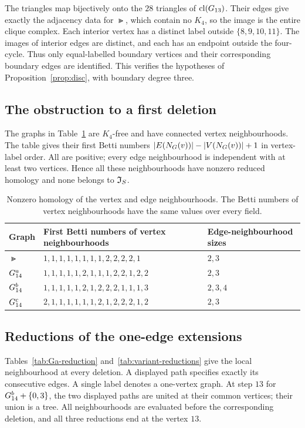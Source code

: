 The triangles map bijectively onto the $28$ triangles of $\operatorname{cl}(G_{13})$.
Their edges give exactly the adjacency data for $\Gt$, which contain
no $K_4$, so the image is the entire clique complex. Each interior
vertex has a distinct label outside $\{8,9,10,11\}$. The images of
interior edges are distinct, and each has an endpoint outside the
four-cycle. Thus only equal-labelled boundary vertices and their
corresponding boundary edges are identified. This verifies the
hypotheses of Proposition~\ref{prop:disc}, with boundary degree three.

\subsection{The obstruction to a first deletion}

The graphs in Table~\ref{tab:witness-links} are $K_4$-free and have
connected vertex neighbourhoods. The table gives their first Betti
numbers $|E(N_G(v))|-|V(N_G(v))|+1$ in vertex-label order.
All are positive; every edge neighbourhood is independent with at
least two vertices. Hence all these neighbourhoods have nonzero
reduced homology and none belongs to $\mathfrak I_S$.

\begin{table}[htbp]
\centering\small
\caption{Nonzero homology of the vertex and edge neighbourhoods.
The Betti numbers of vertex neighbourhoods have the same values over
every field.}\label{tab:witness-links}
\begin{tabular}{@{}lll@{}}
\toprule
Graph & First Betti numbers of vertex neighbourhoods & Edge-neighbourhood sizes\\
\midrule
$\Gt$ & $1,1,1,1,1,1,1,1,2,2,2,2,1$ & $2,3$\\
$G_{14}^{a}$ & $1,1,1,1,1,2,1,1,1,2,2,1,2,2$ & $2,3$\\
$G_{14}^{b}$ & $1,1,1,1,1,2,1,2,2,2,1,1,1,3$ & $2,3,4$\\
$G_{14}^{c}$ & $2,1,1,1,1,1,1,2,1,2,2,2,1,2$ & $2,3$\\
\bottomrule
\end{tabular}
\end{table}

\subsection{Reductions of the one-edge extensions}

Tables~\ref{tab:Ga-reduction} and~\ref{tab:variant-reductions} give
the local neighbourhood at every deletion. A displayed path specifies
exactly its consecutive edges. A single label denotes a one-vertex
graph. At step $13$ for $G_{14}^{b}+\{0,3\}$, the two displayed paths are
united at their common vertices; their union is a tree.
All neighbourhoods are evaluated before the corresponding deletion,
and all three reductions end at the vertex $13$.

